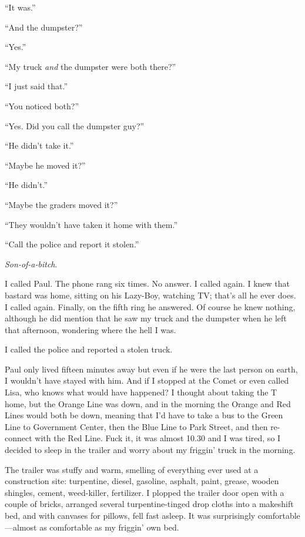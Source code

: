 ``It was.''

``And the dumpster?''

``Yes.''

``My truck \emph{and} the dumpster were both there?''

``I just said that.''

``You noticed both?''

``Yes. Did you call the dumpster guy?''

``He didn't take it.''

``Maybe he moved it?''

``He didn't.''

``Maybe the graders moved it?''

``They wouldn't have taken it home with them.''

``Call the police and report it stolen.''

\emph{Son-of-a-bitch}.

I called Paul. The phone rang six times. No answer. I called again. I
knew that bastard was home, sitting on his Lazy-Boy, watching TV; that's
all he ever does. I called again. Finally, on the fifth ring he
answered. Of course he knew nothing, although he did mention that he saw
my truck and the dumpster when he left that afternoon, wondering where
the hell I was.

I called the police and reported a stolen truck.

Paul only lived fifteen minutes away but even if he were the last person
on earth, I wouldn't have stayed with him. And if I stopped at the Comet
or even called Lisa, who knows what would have happened? I thought about
taking the T home, but the Orange Line was down, and in the morning the
Orange and Red Lines would both be down, meaning that I'd have to take a
bus to the Green Line to Government Center, then the Blue Line to Park
Street, and then re-connect with the Red Line. Fuck it, it was almost
10.30 and I was tired, so I decided to sleep in the trailer and worry
about my friggin' truck in the morning.

The trailer was stuffy and warm, smelling of everything ever used at a
construction site: turpentine, diesel, gasoline, asphalt, paint, grease,
wooden shingles, cement, weed-killer, fertilizer. I plopped the trailer
door open with a couple of bricks, arranged several turpentine-tinged
drop cloths into a makeshift bed, and with canvases for pillows, fell
fast asleep. It was surprisingly comfortable---almost as comfortable as
my friggin' own bed.\\

